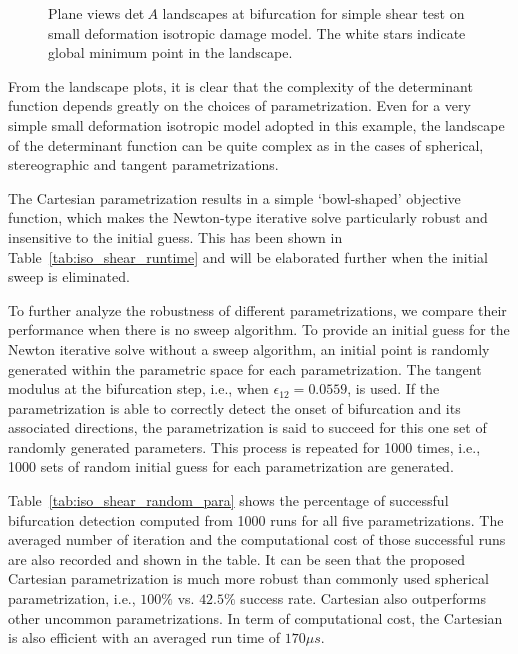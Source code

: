 \documentclass[12pt]{article}
\numberwithin{equation}{section}
\begin{document}
\begin{figure}[H]
{ } 
   \caption{Plane views det$~A$ landscapes at bifurcation
   for simple shear test on small deformation isotropic damage model.
   The white stars indicate global minimum point in the landscape.}
   \label{fig:iso_shear_detAXplane}
 \end{figure}

From the landscape plots, it is clear that the complexity of the
determinant function depends greatly on the choices of
parametrization. Even for a very simple small deformation isotropic
model adopted in this example, the landscape of the determinant
function can be quite complex as in the cases of spherical,
stereographic and tangent parametrizations.

The Cartesian parametrization results in a simple `bowl-shaped'
objective function, which makes the Newton-type iterative solve
particularly robust and insensitive to the initial guess. This has
been shown in Table~\ref{tab:iso_shear_runtime} and will be
elaborated further when the initial sweep is eliminated.

To further analyze the robustness of different parametrizations, we
compare their performance when there is no sweep algorithm. To provide
an initial guess for the Newton iterative solve without a sweep
algorithm, an initial point is randomly generated within the
parametric space for each parametrization. The tangent modulus at the
bifurcation step, i.e., when $\epsilon_{12}=0.0559$, is used. If the
parametrization is able to correctly detect the onset of bifurcation
and its associated directions, the parametrization is said to succeed
for this one set of randomly generated parameters. This process is
repeated for 1000 times, i.e., 1000 sets of random initial guess for
each parametrization are generated.

Table~\ref{tab:iso_shear_random_para} shows the percentage of
successful bifurcation detection computed from 1000 runs for all five
parametrizations. The averaged number of iteration and the
computational cost of those successful runs are also recorded and
shown in the table. It can be seen that the proposed Cartesian
parametrization is much more robust than commonly used spherical
parametrization, i.e., $100\%$ vs. $42.5\%$ success rate. Cartesian
also outperforms other uncommon parametrizations. In term of
computational cost, the Cartesian is also efficient with an averaged
run time of $170\mu s$.
\end{document}
